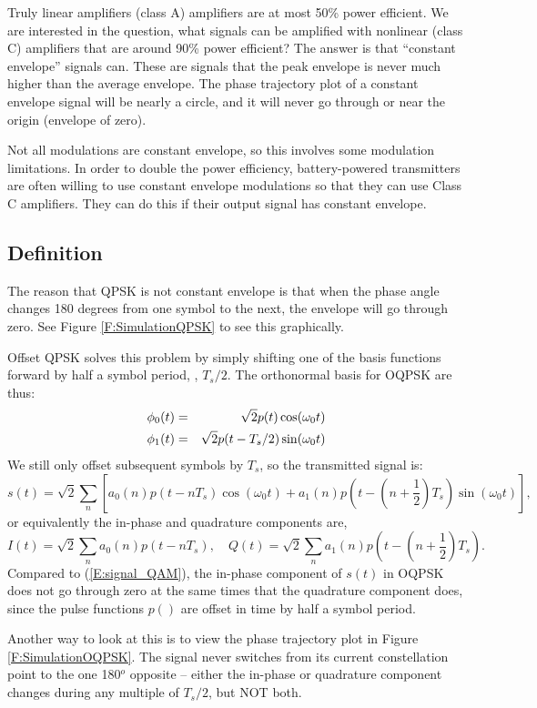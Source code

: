 Truly linear amplifiers (class A) amplifiers are at most 50\% power efficient.  We are interested in the question, what signals can be amplified with nonlinear (class C) amplifiers that are around 90\% power efficient?  The answer is that ``constant envelope'' signals can.  These are signals that the peak envelope is never much higher than the average envelope.  The phase trajectory plot of a constant envelope signal will be nearly a circle, and it will never go through or near the origin (envelope of zero).

Not all modulations are constant envelope, so this involves some modulation limitations. In order to double the power efficiency, battery-powered transmitters are often willing to use constant envelope modulations so that they can use Class C amplifiers.  They can
do this if their output signal has constant envelope.  

\subsection{Definition}

The reason that QPSK is not constant envelope is that when the phase angle changes 180 degrees from one symbol to the next, the envelope will go through zero.  See Figure \ref{F:SimulationQPSK} to see this graphically.

Offset QPSK solves this problem by simply shifting one of the basis functions forward by half a symbol period, \ie, $T_s/2$.  The orthonormal basis for OQPSK are thus:
\begin{eqnarray}
  \phi_0(t) &=& \sqrt{2} p(t) \cos(\omega_0 t) \nonumber \\ 
  \phi_1(t) &=& \sqrt{2} p(t - T_s/2) \sin(\omega_0 t) \nonumber
\end{eqnarray}
We still only offset subsequent symbols by $T_s$, so the transmitted signal is:
\[
 s(t) = \sqrt{2} \sum_n \left[ a_0(n) p(t-nT_s) \cos(\omega_0 t) + a_1(n)  p\left(t-\left(n+\frac{1}{2}\right)T_s\right) \sin(\omega_0 t) \right],
\]
or equivalently the in-phase and quadrature components are,
\[
 I(t) = \sqrt{2} \sum_n a_0(n)p(t-nT_s), \quad Q(t) = \sqrt{2} \sum_n a_1(n)p\left(t-\left(n+\frac{1}{2}\right)T_s\right).
\]
Compared to (\ref{E:signal_QAM}), the in-phase component of $s(t)$ in OQPSK does not go through zero at the same times that the quadrature component does, since the pulse functions $p()$ are offset in time by half a symbol period.  

Another way to look at this is to view the phase trajectory plot in Figure \ref{F:SimulationOQPSK}.  The signal never switches from its current constellation point to the one 180$^o$ opposite -- either the in-phase or quadrature component changes during any multiple of $T_s/2$, but NOT both.

